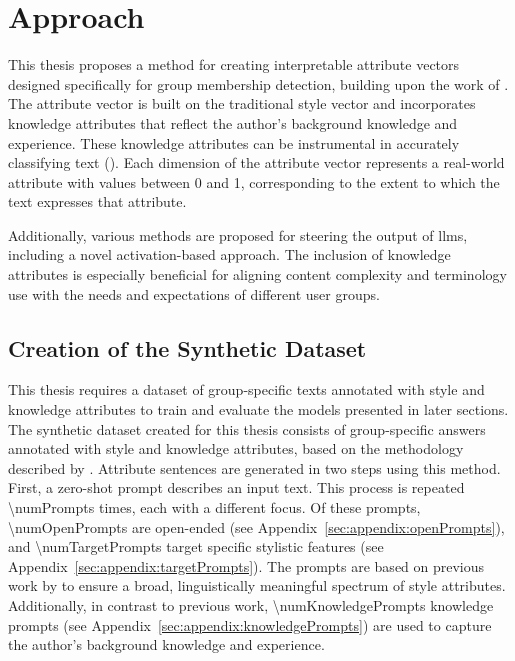 \chapter{Approach}%
\label{sec:approach}

This thesis proposes a method for creating interpretable attribute vectors designed specifically for group membership detection, building upon the work of \citet{patelLearningInterpretableStyle2023}. The attribute vector is built on the traditional style vector and incorporates knowledge attributes that reflect the author's background knowledge and experience. These knowledge attributes can be instrumental in accurately classifying text (\cite{jin-etal-2022-deep}). Each dimension of the attribute vector represents a real-world attribute with values between \num{0} and \num{1}, corresponding to the extent to which the text expresses that attribute.

Additionally, various methods are proposed for steering the output of \acp{llm}, including a novel activation-based approach. The inclusion of knowledge attributes is especially beneficial for aligning content complexity and terminology use with the needs and expectations of different user groups.

\section{Creation of the Synthetic Dataset}%
\label{sec:approach:attributeSentenceGeneration}
This thesis requires a dataset of group-specific texts annotated with style and knowledge attributes to train and evaluate the models presented in later sections.
The synthetic dataset created for this thesis consists of group-specific answers annotated with style and knowledge attributes, based on the methodology described by \citet{patelLearningInterpretableStyle2023}. Attribute sentences are generated in two steps using this method. First, a zero-shot prompt describes an input text. This process is repeated \num{\numPrompts} times, each with a different focus. Of these prompts, \num{\numOpenPrompts} are open-ended (see Appendix~\ref{sec:appendix:openPrompts}), and \num{\numTargetPrompts} target specific stylistic features (see Appendix~\ref{sec:appendix:targetPrompts}). The prompts are based on previous work by \citet{patelLearningInterpretableStyle2023,tausczikPsychologicalMeaningWords2010} to ensure a broad, linguistically meaningful spectrum of style attributes. Additionally, in contrast to previous work, \num{\numKnowledgePrompts} knowledge prompts (see Appendix~\ref{sec:appendix:knowledgePrompts}) are used to capture the author's background knowledge and experience.

